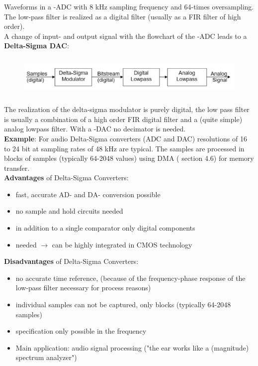 Waveforms in a -ADC with 8 kHz sampling frequency and 64-times oversampling. The low-pass filter is realized as a digital filter (usually as a FIR filter of high order). \\

A change of input- and output signal with the flowchart of the -ADC leads to a \\

{\rot\bf Delta-Sigma DAC}:\\

    \begin{figure}[h]
    \centering
    \includegraphics[width=14cm, height=2cm]{Images/image180.png}
    \label{fig:Fig 139}
    \end{figure}

The realization of the delta-sigma modulator is purely digital, the low pass filter is usually a combination of a high order FIR digital filter and a (quite simple) analog lowpass filter. With a -DAC no decimator is needed.\\

\textbf{Example}: For audio Delta-Sigma converters (ADC and DAC) resolutions of 16 to 24 bit at  sampling rates of 48 kHz are typical. The samples are processed in blocks of samples (typically 64-2048 values) using DMA ( section  4.6) for memory transfer.\\

\textbf{Advantages } of Delta-Sigma Converters:

\begin{itemize}
\item  fast, accurate AD- and DA- conversion possible
\item  no sample and hold circuits needed
\item  in addition to a single comparator only digital components
\item needed $\rightarrow$ can be highly integrated in CMOS technology
\end{itemize}

\textbf{Disadvantages } of Delta-Sigma Converters:

\begin{itemize}
\item  no accurate time reference, (because of the frequency-phase response of the low-pass filter necessary for process reasons)
\item  individual samples can not be captured, only blocks (typically 64-2048 samples)
\item  specification only possible in the frequency
\item  Main application: audio signal processing ("the ear works like a (magnitude) spectrum analyzer")
\end{itemize}
\newpage
